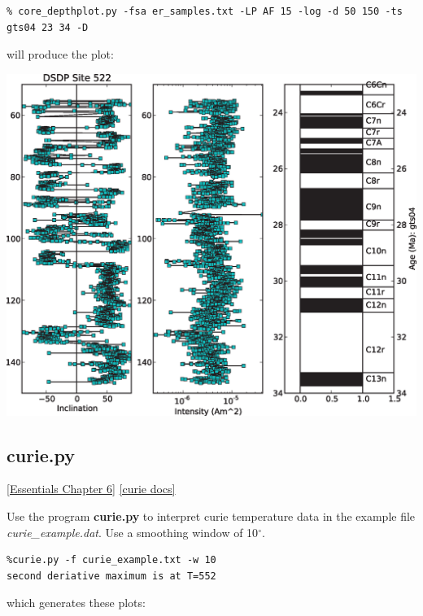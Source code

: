 \documentclass[11pt]{book}
\begin{document}
{{\begin{verbatim}
% core_depthplot.py -fsa er_samples.txt -LP AF 15 -log -d 50 150 -ts gts04 23 34 -D
\end{verbatim}

\noindent  will produce the plot:

\includegraphics[width=15cm]{EPSfiles/core-depthplot.eps}


\subsection{curie.py}
\href{http://earthref.org/MAGIC/books/Tauxe/Essentials/WebBook3ch6.html#ch6}{[Essentials Chapter 6]}
\href{https://github.com/PmagPy/PmagPy/blob/master/programs/curie.py}{[curie docs]}

Use the program {\bf curie.py} to interpret curie temperature data in the example file {\it curie\_example.dat}.  Use a smoothing window of 10$^{\circ}$.



\begin{verbatim}
%curie.py -f curie_example.txt -w 10
second deriative maximum is at T=552
\end{verbatim}

\noindent which generates these plots:

}}
\end{document}
